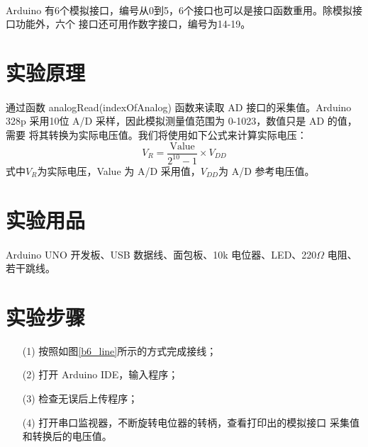 \documentclass[UTF8, oneside]{ctexbook}
\begin{document}
\paragraph{}
Arduino 有6个模拟接口，编号从0到5，6个接口也可以是接口函数重用。除模拟接口功能外，六个
接口还可用作数字接口，编号为14-19。

\section{实验原理}
\paragraph{}
通过函数 analogRead(indexOfAnalog) 函数来读取 AD 接口的采集值。Arduino 328p 
采用10位 A/D 采样，因此模拟测量值范围为 0-1023，数值只是 AD 的值，需要
将其转换为实际电压值。我们将使用如下公式来计算实际电压：
\begin{equation*}
    V_R = \frac{\text{Value}}{2^{10}-1}\times V_{DD}
\end{equation*}
式中$V_R$为实际电压，Value 为 A/D 采用值，$V_{DD}$为 A/D 参考电压值。

\section{实验用品}
\paragraph{}
Arduino UNO 开发板、USB 数据线、面包板、10k 电位器、LED、220$\Omega$ 电阻、若干跳线。

\section{实验步骤}
\begin{itemize}
    \item[(1)] 按照如图\ref{b6_line}所示的方式完成接线；
    \item[(2)] 打开 Arduino IDE，输入程序；
    \item[(3)] 检查无误后上传程序；
    \item[(4)] 打开串口监视器，不断旋转电位器的转柄，查看打印出的模拟接口
    采集值和转换后的电压值。 
\end{itemize}
\end{document}
